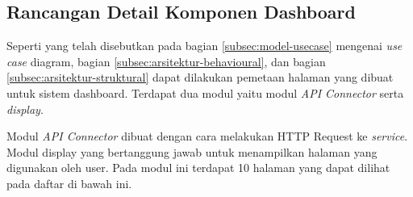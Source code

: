 \subsection{Rancangan Detail Komponen Dashboard}
\label{sec:rancangan-dashboard}

Seperti yang telah disebutkan pada bagian \ref{subsec:model-usecase} mengenai \textit{use case} diagram, bagian \ref{subsec:arsitektur-behavioural}, dan bagian \ref{subsec:arsitektur-struktural} dapat dilakukan pemetaan halaman yang dibuat untuk sistem dashboard. Terdapat dua modul yaitu modul \textit{API Connector} serta \textit{display}.

Modul \textit{API Connector} dibuat dengan cara melakukan HTTP Request ke \textit{service}. Modul display yang bertanggung jawab untuk menampilkan halaman yang digunakan oleh user. Pada modul ini terdapat 10 halaman yang dapat dilihat pada daftar di bawah ini.

